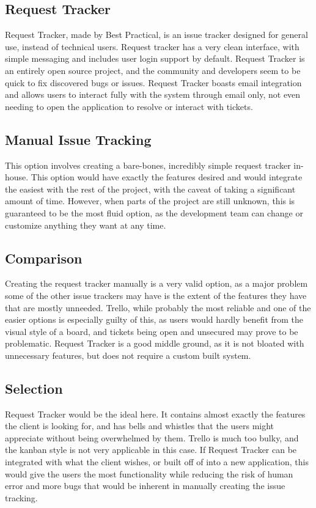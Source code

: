 \documentclass[onecolumn, draftclsnofoot,10pt, compsoc]{IEEEtran}
\begin{document}
\subsection{Request Tracker}
Request Tracker, made by Best Practical, is an issue tracker designed for general use, instead of technical users. Request tracker has a very clean interface, with simple messaging
and includes user login support by default. Request Tracker is an entirely open source project, and the community and developers seem to be quick to fix discovered bugs or issues. 
Request Tracker boasts email integration and allows users to interact fully with the system through email only, not even needing to open the application to resolve or interact with
tickets.
\subsection{Manual Issue Tracking}
This option involves creating a bare-bones, incredibly simple request tracker in-house. This option would have exactly the features desired and would integrate the easiest with the 
rest of the project, with the caveat of taking a significant amount of time. However, when parts of the project are still unknown, this is guaranteed to be the most fluid option, 
as the development team can change or customize anything they want at any time. 
\subsection{Comparison}
Creating the request tracker manually is a very valid option, as a major problem some of the other issue trackers may have is the extent of the features they have that are mostly 
unneeded. Trello, while probably the most reliable and one of the easier options is especially guilty of this, as users would hardly benefit from the visual style of a board, and 
tickets being open and unsecured may prove to be problematic. Request Tracker is a good middle ground, as it is not bloated with unnecessary features, but does not require a custom
built system.
\subsection{Selection}
Request Tracker would be the ideal here. It contains almost exactly the features the client is looking for, and has bells and whistles that the users might appreciate without being 
overwhelmed by them. Trello is much too bulky, and the kanban style is not very applicable in this case. If Request Tracker can be integrated with what the client wishes, or built off 
of into a new application, this would give the users the most functionality while reducing the risk of human error and more bugs that would be inherent in manually creating the issue 
tracking.
\end{document}
